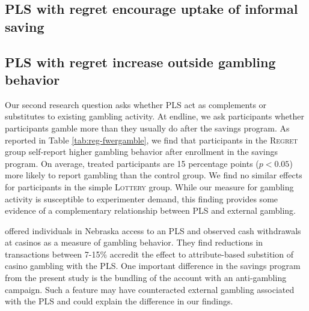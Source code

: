 \documentclass[11pt]{article}
\begin{document}


	\subsection{PLS with regret encourage uptake of informal saving}


		

	\subsection{PLS with regret increase outside gambling behavior}

		Our second research question asks whether PLS act as complements or substitutes to existing gambling activity. At endline, we ask participants whether participants gamble more than they usually do after the savings program. As reported in Table \ref{tab:reg-fwergamble}, we find that participants in the \textsc{Regret} group self-report higher gambling behavior after enrollment in the savings program. On average, treated participants are 15 percentage points ($p < 0.05$) more likely to report gambling than the control group. We find no similar effects for participants in the simple \textsc{Lottery} group. While our measure for gambling activity is susceptible to experimenter demand, this finding provides some evidence of a complementary relationship between PLS and external gambling.

		 offered individuals in Nebraska access to an PLS and observed cash withdrawals at casinos as a measure of gambling behavior. They find reductions in transactions between 7-15\% accredit the effect to attribute-based substition of casino gambling with the PLS. One important difference in the savings program from the present study is the bundling of the account with an anti-gambling campaign. Such a feature may have counteracted external gambling associated with the PLS and could explain the difference in our findings.
\end{document}
